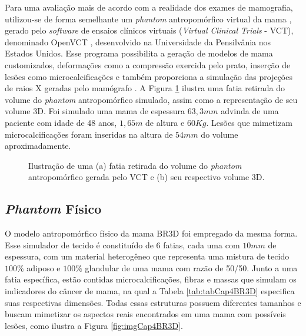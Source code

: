 Para uma avaliação mais de acordo com a realidade dos exames de mamografia, utilizou-se de forma semelhante um \textit{phantom} antropomórfico virtual da mama \cite{bakic2002mammogram1,bakic2002mammogram2,bakic2003mammogram}, gerado pelo \textit{software} de ensaios clínicos virtuais (\textit{Virtual Clinical Trials} - \acs{VCT}), denominado OpenVCT \cite{BakicVCT}, desenvolvido na Universidade da Pensilvânia nos Estados Unidos. Esse programa possibilita a geração de modelos de mama customizados, deformações como a compressão exercida pelo prato, inserção de lesões como microcalcificações e também proporciona a simulação das projeções de raios X geradas pelo mamógrafo \cite{barufaldi2018openvct}. A Figura \ref{fig:imgCap4PhantomVCT} ilustra uma fatia retirada do volume do \textit{phantom} antropomórfico simulado, assim como a representação de seu volume \acs{3D}. Foi simulado uma mama de espessura $63,3mm$ advinda de uma paciente com idade de 48 anos, $1,65m$ de altura e $60Kg$. Lesões que mimetizam microcalcificações foram inseridas na altura de $54mm$ do volume aproximadamente. 

\begin{figure}[htb]
	\centering
	
	\caption{Ilustração de uma (a) fatia retirada do volume do \textit{phantom} antropomórfico gerada pelo \acs{VCT} e (b) seu respectivo volume \acs{3D}.}
	
	\hfil
	\hfil

	\label{fig:imgCap4PhantomVCT}
\end{figure}

\subsection{\textit{Phantom} Físico}

 O modelo antropomórfico físico da mama BR3D \cite{PhantomBR3D} foi empregado da mesma forma. Esse simulador de tecido é constituído de 6 fatias, cada uma com $10mm$ de espessura, com um material heterogêneo que representa uma mistura de tecido $100\%$ adiposo e $100\%$ glandular de uma mama com razão de 50/50. Junto a uma fatia específica, estão contidas microcalcificações, fibras e massas que simulam os indicadores do câncer de mama, na qual a Tabela \ref{tab:tabCap4BR3D} especifica suas respectivas dimensões. Todas essas estruturas possuem diferentes tamanhos e buscam mimetizar os aspectos reais encontrados em uma mama com possíveis lesões, como ilustra a Figura \ref{fig:imgCap4BR3D}.
 
